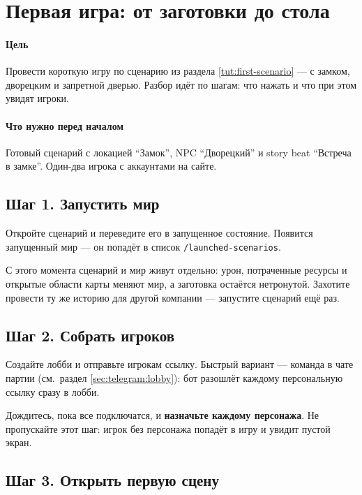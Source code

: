 \section{Первая игра: от заготовки до стола}\label{tut:first-session}

\paragraph{Цель}
Провести короткую игру по сценарию из раздела \ref{tut:first-scenario} --- с замком, дворецким и запретной дверью. Разбор идёт по шагам: что нажать и что при этом увидят игроки.

\paragraph{Что нужно перед началом}
Готовый сценарий с локацией ``Замок'', NPC ``Дворецкий'' и story beat ``Встреча в замке''. Один-два игрока с аккаунтами на сайте.

\subsection{Шаг 1. Запустить мир}\label{tut:first-session:launch}

Откройте сценарий и переведите его в запущенное состояние. Появится запущенный мир --- он попадёт в список \texttt{/launched-scenarios}.

С этого момента сценарий и мир живут отдельно: урон, потраченные ресурсы и открытые области карты меняют мир, а заготовка остаётся нетронутой. Захотите провести ту же историю для другой компании --- запустите сценарий ещё раз.

\subsection{Шаг 2. Собрать игроков}\label{tut:first-session:lobby}

Создайте лобби и отправьте игрокам ссылку. Быстрый вариант --- команда в чате партии (см.\ раздел \ref{sec:telegram:lobby}): бот разошлёт каждому персональную ссылку сразу в лобби.

Дождитесь, пока все подключатся, и \textbf{назначьте каждому персонажа}. Не пропускайте этот шаг: игрок без персонажа попадёт в игру и увидит пустой экран.

\subsection{Шаг 3. Открыть первую сцену}\label{tut:first-session:first-scene}

